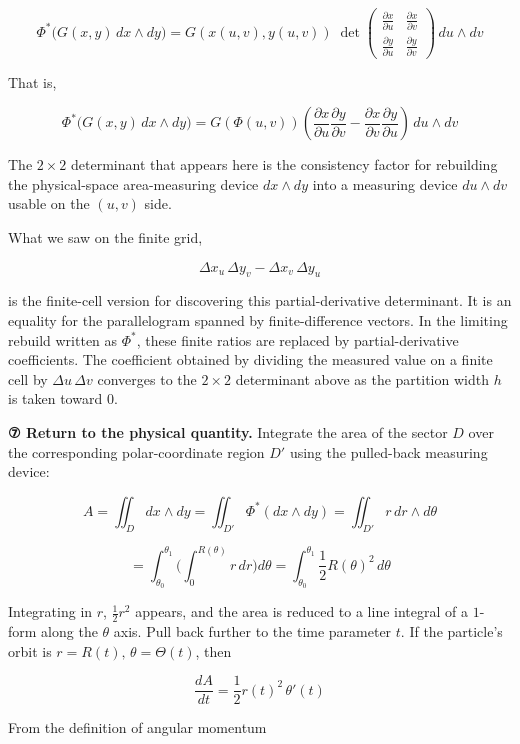 \documentclass[a4paper,12pt,openany]{book}
\begin{document}
\[\Phi^*\bigl(G(x,y)\,dx \wedge dy\bigr) = G(x(u,v), y(u,v))\;
\det\!\begin{pmatrix}
\frac{\partial x}{\partial u} & \frac{\partial x}{\partial v} \\[6pt]
\frac{\partial y}{\partial u} & \frac{\partial y}{\partial v}
\end{pmatrix}
\,du \wedge dv\]

That is,

\[\Phi^*\bigl(G(x,y)\,dx \wedge dy\bigr)
=G(\Phi(u,v))\left(
\frac{\partial x}{\partial u}\frac{\partial y}{\partial v}
-\frac{\partial x}{\partial v}\frac{\partial y}{\partial u}
\right)\,du\wedge dv\]

The \(2\times2\) determinant that appears here is the consistency factor
for rebuilding the physical-space area-measuring device \(dx\wedge dy\)
into a measuring device \(du\wedge dv\) usable on the \((u,v)\) side.

What we saw on the finite grid,

\[\Delta x_u\,\Delta y_v-\Delta x_v\,\Delta y_u\]

is the finite-cell version for discovering this partial-derivative
determinant. It is an equality for the parallelogram spanned by
finite-difference vectors. In the limiting rebuild written as
\(\Phi^*\), these finite ratios are replaced by partial-derivative
coefficients. The coefficient obtained by dividing the measured value on
a finite cell by \(\Delta u\,\Delta v\) converges to the \(2\times2\)
determinant above as the partition width \(h\) is taken toward \(0\).

\textbf{⑦ Return to the physical quantity.} Integrate the area of the
sector \(D\) over the corresponding polar-coordinate region \(D'\) using
the pulled-back measuring device:

\[
A
=
\iint_D dx\wedge dy
=
\iint_{D'} \Phi^*(dx\wedge dy)
=
\iint_{D'} r\,dr\wedge d\theta
\]

\[
=
\int_{\theta_0}^{\theta_1}
\biggl(
  \int_0^{R(\theta)} r\,dr
\biggr)
d\theta
=
\int_{\theta_0}^{\theta_1}
\frac{1}{2}R(\theta)^2\,d\theta
\]

Integrating in \(r\), \(\frac{1}{2}r^2\) appears, and the area is
reduced to a line integral of a \(1\)-form along the \(\theta\) axis.
Pull back further to the time parameter \(t\). If the particle's orbit
is \(r = R(t),\, \theta = \Theta(t)\), then

\[
\frac{dA}{dt}
=
\frac{1}{2}r(t)^2\,\theta'(t)
\]

From the definition of angular momentum
\end{document}
